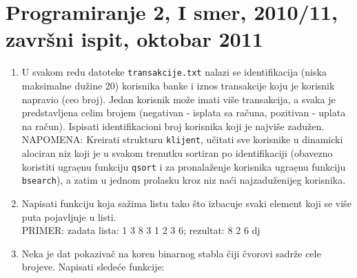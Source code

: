 \section{Programiranje 2, I smer, 2010/11, zavr\v{s}ni ispit, oktobar 2011}

\begin{enumerate}

\item U svakom redu datoteke \verb|transakcije.txt| nalazi se identifikacija (niska maksimalne du\v zine 20) korisnika banke i iznos transakcije koju je korisnik napravio (ceo broj). Jedan korisnik mo\v ze imati vi\v se transakcija, a svaka je predstavljena celim brojem (negativan - isplata sa ra\v cuna, pozitivan - uplata na ra\v cun). Ispisati identifikacioni broj korisnika koji je najvi\v se zadu\v zen. \\
NAPOMENA: Kreirati strukturu \verb|klijent|, u\v citati sve korisnike u dinamicki alociran niz koji je u svakom trenutku sortiran po identifikaciji (obavezno koristiti ugra\d enu funkciju \verb|qsort| i za pronala\v zenje korisnika ugra\d enu funkciju \verb|bsearch|), a zatim u jednom prolasku kroz niz na\' ci najzadu\v zenijeg korisnika.

\item Napisati funkciju koja sa\v zima listu tako \v sto izbacuje svaki element koji se vi\v se puta pojavljuje u listi. \\
PRIMER: zadata lista: 1 3 8 3 1 2 3 6; rezultat: 8 2 6
dj
\item Neka je dat pokaziva\v c na koren binarnog stabla \v ciji \v cvorovi sadr\v ze cele brojeve. Napisati slede\' ce funkcije:

\end{enumerate}

